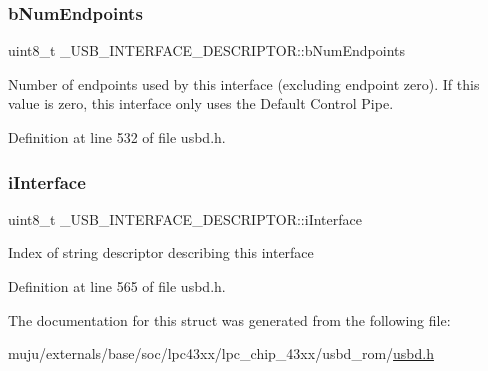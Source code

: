 \subsubsection{\texorpdfstring{b\+Num\+Endpoints}{bNumEndpoints}}
{\footnotesize\ttfamily uint8\+\_\+t \+\_\+\+U\+S\+B\+\_\+\+I\+N\+T\+E\+R\+F\+A\+C\+E\+\_\+\+D\+E\+S\+C\+R\+I\+P\+T\+O\+R\+::b\+Num\+Endpoints}

Number of endpoints used by this interface (excluding endpoint zero). If this value is zero, this interface only uses the Default Control Pipe. 

Definition at line 532 of file usbd.\+h.

\mbox{\label{struct___u_s_b___i_n_t_e_r_f_a_c_e___d_e_s_c_r_i_p_t_o_r_a69b79c8ff54fe5c4ce9e0517923332a5}} 
\subsubsection{\texorpdfstring{i\+Interface}{iInterface}}
{\footnotesize\ttfamily uint8\+\_\+t \+\_\+\+U\+S\+B\+\_\+\+I\+N\+T\+E\+R\+F\+A\+C\+E\+\_\+\+D\+E\+S\+C\+R\+I\+P\+T\+O\+R\+::i\+Interface}

Index of string descriptor describing this interface 

Definition at line 565 of file usbd.\+h.



The documentation for this struct was generated from the following file\+:\begin{DoxyCompactItemize}
\item 
muju/externals/base/soc/lpc43xx/lpc\+\_\+chip\+\_\+43xx/usbd\+\_\+rom/\hyperlink{usbd_8h}{usbd.\+h}\end{DoxyCompactItemize}
